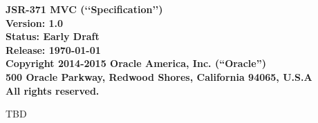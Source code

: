 \begin{flushleft}

{\bfseries JSR-371 MVC (\lq\lq Specification\rq\rq)\\
Version: 1.0 \\
Status: Early Draft \\
Release: \today\\ 
Copyright 2014-2015 Oracle America, Inc. (``Oracle'') \\
500 Oracle Parkway, Redwood Shores, California 94065, U.S.A\\ 
All rights reserved.
}

TBD

\end{flushleft}